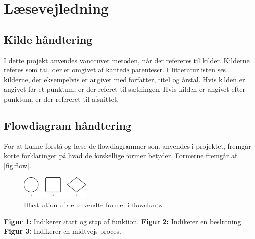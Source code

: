\section{Læsevejledning}



\subsection{Kilde håndtering}
I dette projekt anvendes vancouver metoden, når der refereres til kilder. Kilderne referes som tal, der er omgivet af kantede parenteser. I litteraturlisten ses kilderne, der eksempelvis er angivet med forfatter, titel og årstal. Hvis kilden er angivet før et punktum, er der referet til sætningen. Hvis kilden er angivet efter punktum, er der refereret til afsnittet. 


\subsection{Flowdiagram håndtering} \label{sec:flowhaandtering}
For at kunne forstå og læse de flowdiagrammer som anvendes i projektet, fremgår korte forklaringer på hvad de forskellige former betyder. Formerne fremgår af \autoref{fig:flow}.

\begin{figure}[H]
\centering
\includegraphics[width=0.3\textwidth]{figures/flow}
\caption{Illustration af de anvendte former i flowcharts}
\label{fig:flow}
\end{figure}

\textbf{Figur 1:} Indikerer start og stop af funktion.
\textbf{Figur 2:} Indikerer en beslutning.
\textbf{Figur 3:} Indikerer en midtvejs proces.